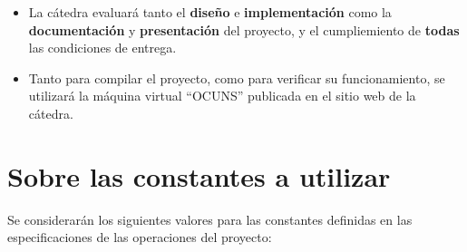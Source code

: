 \documentclass[12pt,a4paper]{article}
\begin{document}
\begin{itemize}
	
	\item La cátedra evaluará tanto el \textbf{diseño} e \textbf{implementación}
	como la \textbf{documentación} y \textbf{presentación} del proyecto, y el cumpliemiento de \textbf{todas} las condiciones de entrega.
	
	\item Tanto para compilar el proyecto, como para verificar su funcionamiento, se utilizará la máquina virtual “OCUNS” publicada en el sitio web de la cátedra.
	
\end{itemize}

\section*{Sobre las constantes a utilizar}
Se considerarán los siguientes valores para las constantes definidas en las especificaciones de las operaciones del proyecto: \\
\end{document}
